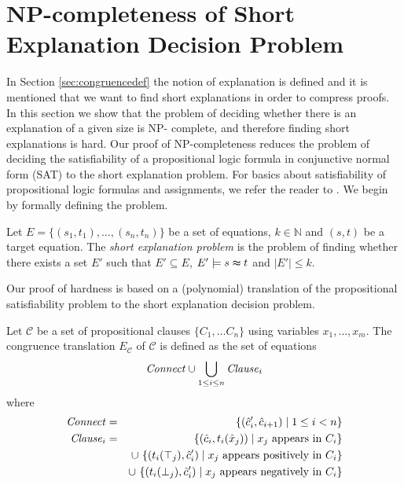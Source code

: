 \documentclass[a4paper,11pt]{article}
\begin{document}
\section{NP-completeness of Short Explanation Decision Problem}
\label{sec:npcomplete}

In Section \ref{sec:congruencedef} the notion of explanation is
defined and it is mentioned that we want to find short explanations
in order to compress proofs. In this section we show that the problem
of deciding whether there is an explanation of a given size is NP-
complete, and therefore finding short explanations is hard. Our proof
of NP-completeness reduces the problem of deciding the satisfiability
of a propositional logic formula in conjunctive normal form (SAT) to
the short explanation problem. For basics about satisfiability of
propositional logic formulas and assignments, we refer the reader to
\cite{Biere2009}. We begin by formally defining the problem.


\begin{definition}
Let $E = \{(s_1,t_1),\ldots,(s_n,t_n)\}$ be a set of equations, 
$k \in \mathbb{N}$ and $(s,t)$ be a target equation.  
The \emph{short explanation problem} is the problem of finding 
whether there exists a set $E'$ such that $E' \subseteq E$, 
$E' \models s \thickapprox t$ and $|E'| \leq k$.
\end{definition}

\noindent Our proof of hardness is based on a (polynomial) 
translation of the propositional satisfiability problem to 
the short explanation decision problem.

\newcommand{\Assignment}{{\it Assignment}}
\newcommand{\Clause}{{\it Clause}}
\newcommand{\Connect}{{\it Connect}}

\begin{definition}

Let $\mathcal{C}$ be a set of propositional clauses $\{C_1,\ldots C_n\}$ using variables $x_1,\ldots,x_m$.
The congruence translation $E_{\mathcal{C}}$ of $\mathcal{C}$ is defined as the set of equations
\begin{equation*}
\Connect \cup \bigcup_{1 \leq i \leq n}\Clause_i 
\end{equation*}
where
\begin{eqnarray*}
	\Connect &=& \{ (\hat{c}_{i}',\hat{c}_{i+1}) \mid 1 \leq i < n\}\\
        \Clause_i &=& \{ (\hat{c}_i, t_i(\hat{x}_j)) \mid x_j \text{ appears in } C_i \}\\
           & & \cup\ \{ (t_i(\top_j), \hat{c}_i') \mid x_j \text{ appears positively in } C_i \}\\
           & & \cup\ \{ (t_i(\bot_j), \hat{c}_i') \mid x_j \text{ appears negatively in } C_i \}
\end{eqnarray*}

\end{definition}
\end{document}
